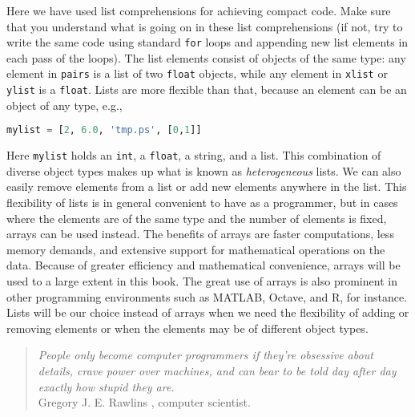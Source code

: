 \documentclass[graybox,sectrefs,envcountresetchap,open=right,final]{svmonodo}
\begin{document}
Here we have used list comprehensions for achieving compact code. Make
sure that you understand what is going on in these list comprehensions
(if not, try to write the same code using standard \texttt{for} loops and
appending new list elements in each pass of the loops).
The list elements consist of objects of the same type: any element in
\texttt{pairs} is a list of two \texttt{float} objects, while any element in \texttt{xlist}
or \texttt{ylist} is a \texttt{float}. Lists are more flexible than that, because an
element can be an object of any type, e.g.,
\begin{lstlisting}[language=Python,style=simple,xleftmargin=2mm]
mylist = [2, 6.0, 'tmp.ps', [0,1]]

\end{lstlisting}

Here \texttt{mylist} holds an \texttt{int}, a \texttt{float}, a string, and a list. This
combination of diverse object types makes up what is known as
\emph{heterogeneous} lists.  We can also easily remove elements from a list
or add new elements anywhere in the list.  This flexibility of lists
is in general convenient to have as a programmer, but in cases where
the elements are of the same type and the number of elements is fixed,
arrays can be used instead. The benefits of arrays are faster
computations, less memory demands, and extensive support for
mathematical operations on the data.  Because of greater efficiency
and mathematical convenience, arrays will be used to a large extent in
this book.  The great use of arrays is also prominent in other
programming environments such as MATLAB, Octave, and R, for instance.
Lists will be our choice instead of arrays when we need the
flexibility of adding or removing elements or when the elements may be
of different object types.

\begin{quote}
\emph{People only become computer programmers if they're
obsessive about details, crave power over machines, and can bear
to be told day after day exactly how
stupid they are.} \\
Gregory J. E. Rawlins \cite{Rawlins_1998}, computer scientist.
\end{quote}
\end{document}
